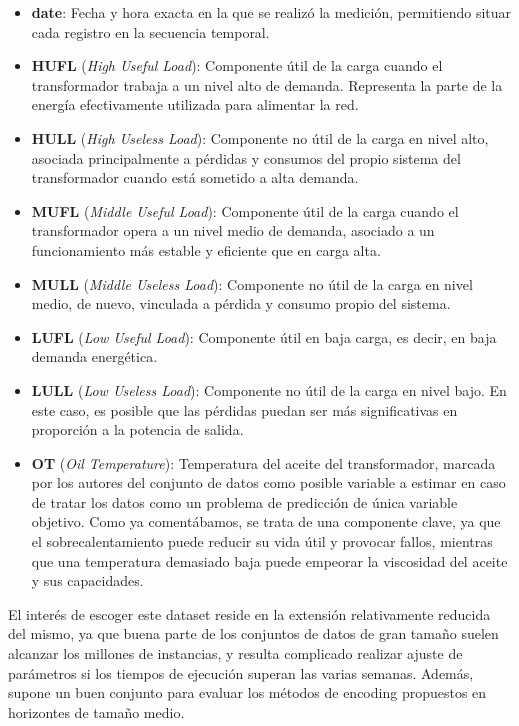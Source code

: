 \begin{itemize}
	\item \textbf{date}: Fecha y hora exacta en la que se realizó la medición, permitiendo situar cada registro en la secuencia temporal.
	
	\item \textbf{HUFL} (\textit{High Useful Load}): Componente útil de la carga cuando el transformador trabaja a un nivel alto de demanda. Representa la parte de la energía efectivamente utilizada para alimentar la red.
	
	\item \textbf{HULL} (\textit{High Useless Load}): Componente no útil de la carga en nivel alto, asociada principalmente a pérdidas y consumos del propio sistema del transformador cuando está sometido a alta demanda.
	
	\item \textbf{MUFL} (\textit{Middle Useful Load}): Componente útil de la carga cuando el transformador opera a un nivel medio de demanda, asociado a un funcionamiento más estable y eficiente que en carga alta.
	
	\item \textbf{MULL} (\textit{Middle Useless Load}): Componente no útil de la carga en nivel medio, de nuevo, vinculada a pérdida y consumo propio del sistema.
	
	\item \textbf{LUFL} (\textit{Low Useful Load}): Componente útil en baja carga, es decir, en baja demanda energética.
	
	\item \textbf{LULL} (\textit{Low Useless Load}): Componente no útil de la carga en nivel bajo. En este caso, es posible que las pérdidas puedan ser más significativas en proporción a la potencia de salida.
	
	\item \textbf{OT} (\textit{Oil Temperature}): Temperatura del aceite del transformador, marcada por los autores del conjunto de datos como posible variable a estimar en caso de tratar los datos como un problema de predicción de única variable objetivo. Como ya comentábamos, se trata de una componente clave, ya que el sobrecalentamiento puede reducir su vida útil y provocar fallos, mientras que una temperatura demasiado baja puede empeorar la viscosidad del aceite y sus capacidades.
\end{itemize}

El interés de escoger este dataset reside en la extensión relativamente reducida del mismo, ya que buena parte de los conjuntos de datos de gran tamaño suelen alcanzar los millones de instancias, y resulta complicado realizar ajuste de parámetros si los tiempos de ejecución superan las varias semanas. Además, supone un buen conjunto para evaluar los métodos de encoding propuestos en horizontes de tamaño medio.\\

